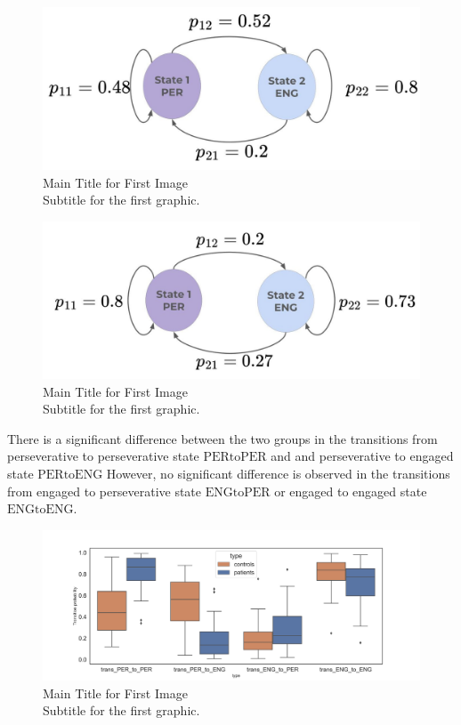 \begin{figure}[H]
    \centering
    \includegraphics[width=12cm]{MainLayout/Images/chapter7/transition_controls.jpg}
    \caption{Main Title for First Image \\ \small Subtitle for the first graphic.}
    \label{fig:transition_controls}
\end{figure}
\begin{figure}[H]
    \centering
    \includegraphics[width=12cm]{MainLayout/Images/chapter7/transition_patients.jpg}
    \caption{Main Title for First Image \\ \small Subtitle for the first graphic.}
    \label{fig:transition_patients}
\end{figure}

There is a significant difference between the two groups in the transitions from perseverative to perseverative state  $\text{PERtoPER}$ and and perseverative to engaged state $\text{PERtoENG}$ However, no significant difference is observed in the transitions from engaged to perseverative state $\text{ENGtoPER}$ or engaged to engaged state $\text{ENGtoENG}$.
\begin{figure}[H]
    \centering
    \includegraphics[width=14cm]{MainLayout/Images/chapter7/transition_probability.jpg}
    \caption{Main Title for First Image \\ \small Subtitle for the first graphic.}
    \label{fig:transition_probability}
\end{figure}

